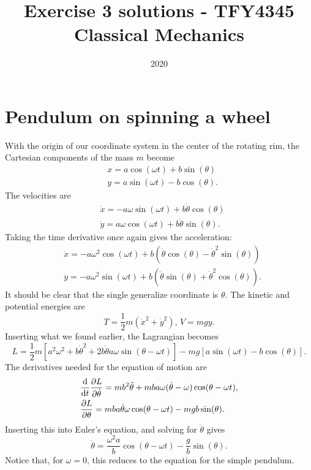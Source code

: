 \documentclass{article}
\title{Exercise 3 solutions - TFY4345 Classical Mechanics}
\date{2020}
\begin{document}
    \maketitle
    \section{Pendulum on spinning a wheel}
        With the origin of our coordinate system in the center of the rotating rim, the Cartesian components of the mass $m$ become
        \begin{align*}
            &x = a \cos(\omega t) + b \sin(\theta) \\
            &y = a \sin(\omega t) - b \cos(\theta).
        \end{align*}
        The velocities are
        \begin{align*}
            &\dot x = - a \omega \sin(\omega t) + b \dot \theta \cos(\theta) \\
            &\dot y = a \omega \cos(\omega t) + b \dot \theta \sin(\theta).
        \end{align*}
        Taking the time derivative once again gives the acceleration:
        \begin{align*}
            &\ddot x = -a \omega^2 \cos(\omega t) + b(\ddot \theta \cos(\theta) - \dot \theta^2 \sin(\theta)) \\
            &\ddot y = - a \omega^2 \sin(\omega t) + b(\ddot \theta \sin(\theta) + \dot \theta^2 \cos(\theta)).
        \end{align*}
        It should be clear that the single generalize coordinate is $\theta$. The kinetic and potential energies are 
        \begin{equation*}
            T = \frac{1}{2}m (\dot x^2 + \dot y^2), \, V = mgy.
        \end{equation*}
        Inserting what we found earlier, the Lagrangian becomes
        \begin{equation*}
            L = \frac{1}{2}m[a^2 \omega^2 
            + b \dot \theta^2 + 2 b \dot \theta a \omega \sin(\theta - \omega t)] 
            - mg[a \sin(\omega t) - b \cos(\theta)].
        \end{equation*}
        The derivatives needed for the equation of motion are
        \begin{align*}
            &\dv{t}\pdv{L}{\dot \theta} 
            = mb^2 \ddot \theta + m b a \omega (\dot \theta - \omega) \cos(\theta - \omega t), \\
            &\pdv{L}{\theta} 
            = mba \dot \theta \omega \cos(\theta - \omega t) - m g b \sin(\theta).
        \end{align*}
        Inserting this into Euler's equation, and solving for $\ddot \theta$ gives
        \begin{equation*}
            \ddot \theta = \frac{\omega^2 a}{b}\cos(\theta-\omega t) - \frac{g}{b} \sin(\theta).
        \end{equation*}
        Notice that, for $\omega = 0$, this reduces to the equation for the simple pendulum.
\end{document}
